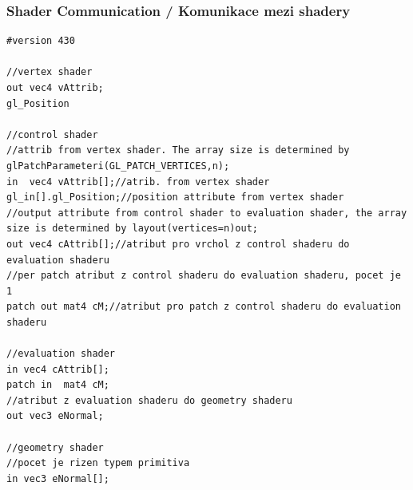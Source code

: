 \begin{frame}[fragile]
\frametitle{Shader Communication / Komunikace mezi shadery}
	{\tiny
\begin{verbatim}
#version 430

//vertex shader
out vec4 vAttrib;
gl_Position

//control shader
//attrib from vertex shader. The array size is determined by glPatchParameteri(GL_PATCH_VERTICES,n);
in  vec4 vAttrib[];//atrib. from vertex shader
gl_in[].gl_Position;//position attribute from vertex shader
//output attribute from control shader to evaluation shader, the array size is determined by layout(vertices=n)out;
out vec4 cAttrib[];//atribut pro vrchol z control shaderu do evaluation shaderu
//per patch atribut z control shaderu do evaluation shaderu, pocet je 1
patch out mat4 cM;//atribut pro patch z control shaderu do evaluation shaderu

//evaluation shader
in vec4 cAttrib[];
patch in  mat4 cM;
//atribut z evaluation shaderu do geometry shaderu
out vec3 eNormal;

//geometry shader
//pocet je rizen typem primitiva
in vec3 eNormal[];
	\end{verbatim}
	}
\end{frame}

